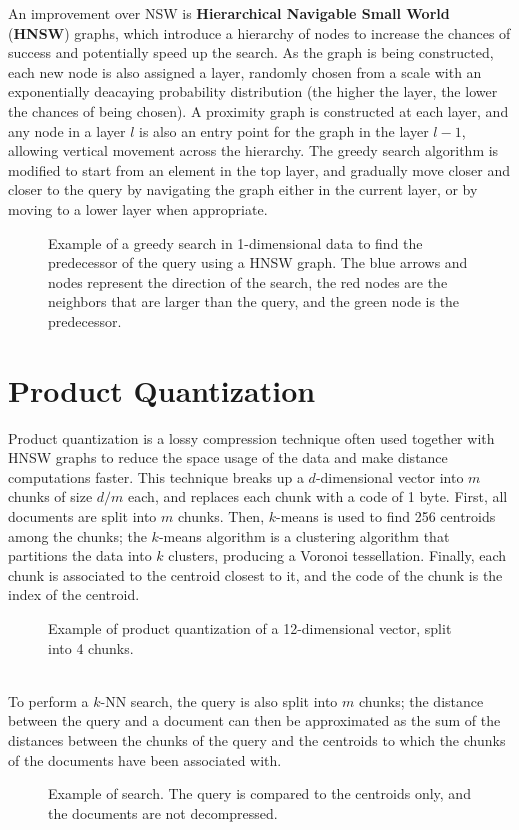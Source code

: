 An improvement over NSW is \textbf{Hierarchical Navigable Small World} (\textbf{HNSW}) graphs, which introduce a hierarchy of nodes to increase the chances of success and potentially speed up the search. As the graph is being constructed, each new node is also assigned a layer, randomly chosen from a scale with an exponentially deacaying probability distribution (the higher the layer, the lower the chances of being chosen). A proximity graph is constructed at each layer, and any node in a layer $l$ is also an entry point for the graph in the layer $l-1$, allowing vertical movement across the hierarchy. The greedy search algorithm is modified to start from an element in the top layer, and gradually move closer and closer to the query by navigating the graph either in the current layer, or by moving to a lower layer when appropriate.
\begin{figure}[h]
    \centering
    
    \caption{Example of a greedy search in 1-dimensional data to find the predecessor of the query using a HNSW graph. The blue arrows and nodes represent the direction of the search, the red nodes are the neighbors that are larger than the query, and the green node is the predecessor.}
\end{figure}

\section{Product Quantization}

Product quantization is a lossy compression technique often used together with HNSW graphs to reduce the space usage of the data and make distance computations faster. This technique breaks up a $d$-dimensional vector into $m$ chunks of size $d/m$ each, and replaces each chunk with a code of 1 byte. 
First, all documents are split into $m$ chunks. Then, $k$-means is used to find 256 centroids among the chunks; the $k$-means algorithm is a clustering algorithm that partitions the data into $k$ clusters, producing a Voronoi tessellation. Finally, each chunk is associated to the centroid closest to it, and the code of the chunk is the index of the centroid.
\begin{figure}[h]
    \centering
    
    \caption{Example of product quantization of a 12-dimensional vector, split into 4 chunks.}
\end{figure} \\
To perform a $k$-NN search, the query is also split into $m$ chunks; the distance between the query and a document can then be approximated as the sum of the distances between the chunks of the query and the centroids to which the chunks of the documents have been associated with.
\begin{figure}[h]
    \centering
    
    \caption{Example of search. The query is compared to the centroids only, and the documents are not decompressed.}
\end{figure}

